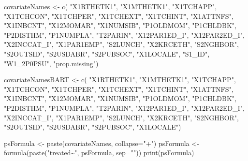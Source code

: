 \documentclass[
]{article}
\newenvironment{Shaded}{\begin{snugshade}}{\end{snugshade}}
\newcommand{\AttributeTok}[1]{\textcolor[rgb]{0.77,0.63,0.00}{#1}}
\newcommand{\FunctionTok}[1]{\textcolor[rgb]{0.00,0.00,0.00}{#1}}
\newcommand{\NormalTok}[1]{#1}
\newcommand{\OtherTok}[1]{\textcolor[rgb]{0.56,0.35,0.01}{#1}}
\newcommand{\StringTok}[1]{\textcolor[rgb]{0.31,0.60,0.02}{#1}}
\begin{document}
\begin{Shaded}
\begin{Highlighting}[]
\NormalTok{covariateNames }\OtherTok{\textless{}{-}} \FunctionTok{c}\NormalTok{(}
    \StringTok{"X1RTHETK1"}\NormalTok{, }
    \StringTok{"X1MTHETK1"}\NormalTok{,}
    \StringTok{"X1TCHAPP"}\NormalTok{, }
    \StringTok{"X1TCHCON"}\NormalTok{,}
    \StringTok{"X1TCHPER"}\NormalTok{, }
    \StringTok{"X1TCHEXT"}\NormalTok{,}
    \StringTok{"X1TCHINT"}\NormalTok{,}
    \StringTok{"X1ATTNFS"}\NormalTok{,}
    \StringTok{"X1INBCNT"}\NormalTok{,}
    \StringTok{"X12MOMAR"}\NormalTok{,}
    \StringTok{"X1NUMSIB"}\NormalTok{, }
    \StringTok{"P1OLDMOM"}\NormalTok{,}
    \StringTok{"P1CHLDBK"}\NormalTok{,}
    \StringTok{"P2DISTHM"}\NormalTok{,}
    \StringTok{"P1NUMPLA"}\NormalTok{,}
    \StringTok{"T2PARIN"}\NormalTok{,}
    \StringTok{"X12PAR1ED\_I"}\NormalTok{,}
    \StringTok{"X12PAR2ED\_I"}\NormalTok{,}
    \StringTok{"X2INCCAT\_I"}\NormalTok{,}
    \StringTok{"X1PAR1EMP"}\NormalTok{,}
    \StringTok{"S2LUNCH"}\NormalTok{,}
    \StringTok{"X2KRCETH"}\NormalTok{,}
    \StringTok{"S2NGHBOR"}\NormalTok{,}
    \StringTok{"S2OUTSID"}\NormalTok{,}
    \StringTok{"S2USDABR"}\NormalTok{,}
    \StringTok{"S2PUBSOC"}\NormalTok{,}
    \StringTok{"X1LOCALE"}\NormalTok{,}
    \StringTok{"S1\_ID"}\NormalTok{,}
    \StringTok{"W1\_2P0PSU"}\NormalTok{,}
    \StringTok{"prop.missing"}\NormalTok{)}

\NormalTok{covariateNamesBART }\OtherTok{\textless{}{-}} \FunctionTok{c}\NormalTok{(}
    \StringTok{"X1RTHETK1"}\NormalTok{, }
    \StringTok{"X1MTHETK1"}\NormalTok{,}
    \StringTok{"X1TCHAPP"}\NormalTok{, }
    \StringTok{"X1TCHCON"}\NormalTok{,}
    \StringTok{"X1TCHPER"}\NormalTok{, }
    \StringTok{"X1TCHEXT"}\NormalTok{,}
    \StringTok{"X1TCHINT"}\NormalTok{,}
    \StringTok{"X1ATTNFS"}\NormalTok{,}
    \StringTok{"X1INBCNT"}\NormalTok{,}
    \StringTok{"X12MOMAR"}\NormalTok{,}
    \StringTok{"X1NUMSIB"}\NormalTok{, }
    \StringTok{"P1OLDMOM"}\NormalTok{,}
    \StringTok{"P1CHLDBK"}\NormalTok{,}
    \StringTok{"P2DISTHM"}\NormalTok{,}
    \StringTok{"P1NUMPLA"}\NormalTok{,}
    \StringTok{"T2PARIN"}\NormalTok{,}
    \StringTok{"X12PAR1ED\_I"}\NormalTok{,}
    \StringTok{"X12PAR2ED\_I"}\NormalTok{,}
    \StringTok{"X2INCCAT\_I"}\NormalTok{,}
    \StringTok{"X1PAR1EMP"}\NormalTok{,}
    \StringTok{"S2LUNCH"}\NormalTok{,}
    \StringTok{"X2KRCETH"}\NormalTok{,}
    \StringTok{"S2NGHBOR"}\NormalTok{,}
    \StringTok{"S2OUTSID"}\NormalTok{,}
    \StringTok{"S2USDABR"}\NormalTok{,}
    \StringTok{"S2PUBSOC"}\NormalTok{,}
    \StringTok{"X1LOCALE"}\NormalTok{)}

\NormalTok{psFormula }\OtherTok{\textless{}{-}} \FunctionTok{paste}\NormalTok{(covariateNames, }\AttributeTok{collapse=}\StringTok{"+"}\NormalTok{)}
\NormalTok{psFormula }\OtherTok{\textless{}{-}} \FunctionTok{formula}\NormalTok{(}\FunctionTok{paste}\NormalTok{(}\StringTok{"treated\textasciitilde{}"}\NormalTok{, psFormula, }\AttributeTok{sep=}\StringTok{""}\NormalTok{))}
\FunctionTok{print}\NormalTok{(psFormula) }
\end{Highlighting}
\end{Shaded}
\end{document}
